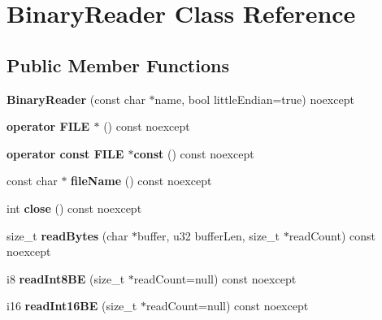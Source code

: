 \hypertarget{class_binary_reader}{}\section{Binary\+Reader Class Reference}
\label{class_binary_reader}
\subsection*{Public Member Functions}
\begin{DoxyCompactItemize}
\item 
\mbox{\label{class_binary_reader_ad87c06247a79128c25005ef519d5aa52}} 
{\bfseries Binary\+Reader} (const char $\ast$name, bool little\+Endian=true) noexcept
\item 
\mbox{\label{class_binary_reader_abf864d2e4e734bcd91985e3f9965a3e9}} 
{\bfseries operator F\+I\+L\+E $\ast$} () const noexcept
\item 
\mbox{\label{class_binary_reader_a1b5085ea806b777567629d602ee73bc9}} 
{\bfseries operator const F\+I\+L\+E $\ast$const} () const noexcept
\item 
\mbox{\label{class_binary_reader_aa9d56766d40f1e64c5d5099bb8983c34}} 
const char $\ast$ {\bfseries file\+Name} () const noexcept
\item 
\mbox{\label{class_binary_reader_a44e44c230bdcbca5144d0372c386b2ff}} 
int {\bfseries close} () const noexcept
\item 
\mbox{\label{class_binary_reader_a2629940915276dad48aadb7533585821}} 
size\+\_\+t {\bfseries read\+Bytes} (char $\ast$buffer, u32 buffer\+Len, size\+\_\+t $\ast$read\+Count) const noexcept
\item 
\mbox{\label{class_binary_reader_a331d118b116cada85efe1c0db805a3bb}} 
i8 {\bfseries read\+Int8\+BE} (size\+\_\+t $\ast$read\+Count=null) const noexcept
\item 
\mbox{\label{class_binary_reader_abfaea2b40f13a841b5be744223ceef73}} 
i16 {\bfseries read\+Int16\+BE} (size\+\_\+t $\ast$read\+Count=null) const noexcept

\end{DoxyCompactItemize}
